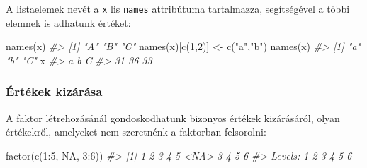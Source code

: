 \documentclass[
]{book}
\newenvironment{Shaded}{\begin{snugshade}}{\end{snugshade}}
\newcommand{\AttributeTok}[1]{\textcolor[rgb]{0.77,0.63,0.00}{#1}}
\newcommand{\CommentTok}[1]{\textcolor[rgb]{0.56,0.35,0.01}{\textit{#1}}}
\newcommand{\ConstantTok}[1]{\textcolor[rgb]{0.00,0.00,0.00}{#1}}
\newcommand{\DecValTok}[1]{\textcolor[rgb]{0.00,0.00,0.81}{#1}}
\newcommand{\FunctionTok}[1]{\textcolor[rgb]{0.00,0.00,0.00}{#1}}
\newcommand{\NormalTok}[1]{#1}
\newcommand{\OtherTok}[1]{\textcolor[rgb]{0.56,0.35,0.01}{#1}}
\newcommand{\SpecialCharTok}[1]{\textcolor[rgb]{0.00,0.00,0.00}{#1}}
\newcommand{\StringTok}[1]{\textcolor[rgb]{0.31,0.60,0.02}{#1}}
\begin{document}
\begin{Shaded}
\end{Shaded}

A listaelemek nevét a \texttt{x} lis \texttt{names} attribútuma tartalmazza, segítségével a többi elemnek is adhatunk értéket:

\begin{Shaded}
\begin{Highlighting}[]
\FunctionTok{names}\NormalTok{(x)}
\CommentTok{\#\textgreater{} [1] "A" "B" "C"}
\FunctionTok{names}\NormalTok{(x)[}\FunctionTok{c}\NormalTok{(}\DecValTok{1}\NormalTok{,}\DecValTok{2}\NormalTok{)] }\OtherTok{\textless{}{-}} \FunctionTok{c}\NormalTok{(}\StringTok{"a"}\NormalTok{,}\StringTok{"b"}\NormalTok{)}
\FunctionTok{names}\NormalTok{(x)}
\CommentTok{\#\textgreater{} [1] "a" "b" "C"}
\NormalTok{x}
\CommentTok{\#\textgreater{}  a  b  C }
\CommentTok{\#\textgreater{} 31 36 33}
\end{Highlighting}
\end{Shaded}

\hypertarget{uxe9rtuxe9kek-kizuxe1ruxe1sa}{%
\subsubsection{Értékek kizárása}\label{uxe9rtuxe9kek-kizuxe1ruxe1sa}}

A faktor létrehozásánál gondoskodhatunk bizonyos értékek kizárásáról, olyan értékekről, amelyeket nem szeretnénk a faktorban felsorolni:

\begin{Shaded}
\begin{Highlighting}[]
\FunctionTok{factor}\NormalTok{(}\FunctionTok{c}\NormalTok{(}\DecValTok{1}\SpecialCharTok{:}\DecValTok{5}\NormalTok{, }\ConstantTok{NA}\NormalTok{, }\DecValTok{3}\SpecialCharTok{:}\DecValTok{6}\NormalTok{))}
\CommentTok{\#\textgreater{}  [1] 1    2    3    4    5    \textless{}NA\textgreater{} 3    4    5    6   }
\CommentTok{\#\textgreater{} Levels: 1 2 3 4 5 6}
\end{Highlighting}
\end{Shaded}
\end{document}
